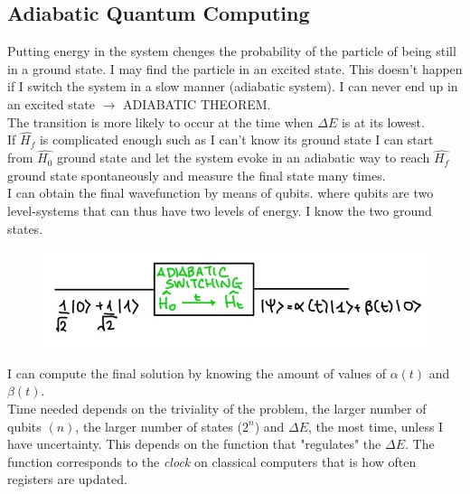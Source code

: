 \subsection{Adiabatic Quantum Computing}
Putting energy in the system chenges the probability of the particle of being still in a ground state. I may find the particle in an excited state. This doesn't happen if I switch the system in a slow manner (adiabatic system). I can never end up in an excited state $\rightarrow$ ADIABATIC THEOREM.\\
The transition is more likely to occur at the time when $\Delta E$ is at its lowest.\\
If $\hat{H_f}$ is complicated enough such as I can't know its ground state I can start from $\hat{H_0}$ ground state and let the system evoke in an adiabatic way to reach $\hat{H_f}$ ground state spontaneously and measure the final state many times.\\
I can obtain the final wavefunction by means of qubits. where qubits are two level-systems that can thus have two levels of energy. I know the two ground states. \\
\begin{figure}[htbp!]
	\centering
	\includegraphics[scale=0.30]{img_10}
\end{figure}
I can compute the final solution by knowing the amount of values of $\alpha(t)$ and $\beta(t)$.\\
Time needed depends on the triviality of the problem, the larger number of qubits $(n)$, the larger number of states ($2^n$) and $\Delta E$, the most time, unless I have uncertainty. This depends on the function that "regulates" the $\Delta E$. The function corresponds to the \textit{clock} on classical computers that is how often registers are updated.\\

